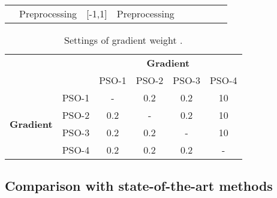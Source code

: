 \documentclass[fleqn,10pt]{wlscirep}
\begin{document}
\begin{table}[htb]
{\begin{tabular}{l|l|l|l|lllll}
\multicolumn{1}{|l|}{}                      & Preprocessing      & [-1,1]         & Preprocessing              &                       &                                              &                                                &                                     &                                              \\ \cline{1-4}
\end{tabular}
}
\end{table} \begin{table}[!htb]
\centering
\caption{Settings of gradient weight .}
\label{tab:table_pso_settings}
\begin{tabular}{ll|cccc|}
\cline{3-6}
                                                &       & \multicolumn{4}{c|}{\textbf{Gradient}}                                                                \\ \cline{3-6} 
                                                &       & \multicolumn{1}{c|}{PSO-1} & \multicolumn{1}{c|}{PSO-2} & \multicolumn{1}{c|}{PSO-3} & PSO-4 \\ \hline
\multicolumn{1}{|l|}{\multirow{4}{*}{\textbf{Gradient}}} & PSO-1 & \multicolumn{1}{c|}{-}     & \multicolumn{1}{c|}{0.2}   & \multicolumn{1}{c|}{0.2}   & 10    \\ \cline{2-6} 
\multicolumn{1}{|l|}{}                          & PSO-2 & \multicolumn{1}{c|}{0.2}   & \multicolumn{1}{c|}{-}     & \multicolumn{1}{c|}{0.2}   & 10    \\ \cline{2-6} 
\multicolumn{1}{|l|}{}                          & PSO-3 & \multicolumn{1}{c|}{0.2}   & \multicolumn{1}{c|}{0.2}   & \multicolumn{1}{c|}{-}     & 10    \\ \cline{2-6} 
\multicolumn{1}{|l|}{}                          & PSO-4 & \multicolumn{1}{c|}{0.2}   & \multicolumn{1}{c|}{0.2}   & \multicolumn{1}{c|}{0.2}   & -     \\ \hline
\end{tabular}
\end{table} \subsection{Comparison with state-of-the-art methods}
\label{sec:stateoftheart}
\end{document}
